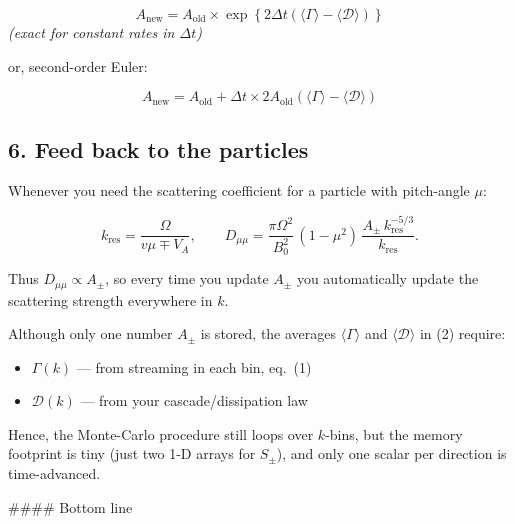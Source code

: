 \begin{tcolorbox}[colframe=black, colback=white, title=Amplitude Update]
\[
A_{\text{new}} = A_{\text{old}} \times \exp\left\{ 2 \Delta t \left( \langle \Gamma \rangle - \langle \mathcal{D} \rangle \right) \right\}
\]
\textit{(exact for constant rates in \( \Delta t \))}
\end{tcolorbox}

or, second-order Euler:


\begin{tcolorbox}[colframe=black, colback=white, title=Amplitude Update (Linearized)]
\[
A_{\text{new}} = A_{\text{old}} + \Delta t \times 2 A_{\text{old}} \left( \langle \Gamma \rangle - \langle \mathcal{D} \rangle \right)
\]
\end{tcolorbox}



\subsection{6.  Feed back to the particles}

Whenever you need the scattering coefficient for a particle with pitch-angle $\mu$:

$$
k_{\text{res}}=\frac{\Omega}{v\mu\mp V_A},\qquad
D_{\mu\mu}= \frac{\pi \Omega^{2}}{B_0^{2}}\,(1-\mu^{2})\,
\frac{A_\pm\,k_{\text{res}}^{-5/3}}{k_{\text{res}}}.
$$

Thus $D_{\mu\mu}\propto A_\pm$, so every time you update $A_\pm$ you automatically update the scattering strength everywhere in $k$.

\begin{tcolorbox}[colframe=black, colback=white, title=Why \(k\)-Resolved Streaming is Still Needed]
Although only one number \( A_{\pm} \) is stored, the averages \( \langle \Gamma \rangle \) and \( \langle \mathcal{D} \rangle \) in (2) require:
\begin{itemize}
    \item \( \Gamma(k) \) — from streaming in each bin, eq.~(1)
    \item \( \mathcal{D}(k) \) — from your cascade/dissipation law
\end{itemize}

Hence, the Monte-Carlo procedure still loops over \( k \)-bins, but the memory footprint is tiny (just two 1-D arrays for \( S_{\pm} \)), and only one scalar per direction is time-advanced.
\end{tcolorbox}

#### Bottom line

